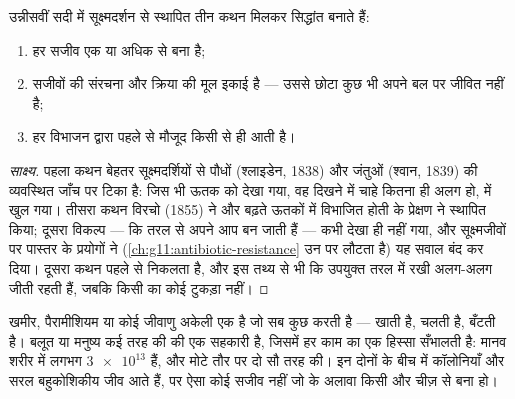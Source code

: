 \begin{proposition}[कोशिका सिद्धांत]\label{prop:g10:cells-common-unit:theory}
उन्नीसवीं सदी में सूक्ष्मदर्शन से स्थापित तीन कथन मिलकर  सिद्धांत
बनाते हैं:
\begin{enumerate}
  \item हर सजीव एक या अधिक  से बना है;
  \item {} सजीवों की संरचना और क्रिया की मूल इकाई है --- उससे छोटा
        कुछ भी अपने बल पर जीवित नहीं है;
  \item हर  विभाजन द्वारा पहले से मौजूद किसी  से ही आती है।
\end{enumerate}
\end{proposition}
\begin{proof}[साक्ष्य]
पहला कथन बेहतर सूक्ष्मदर्शियों से पौधों (श्लाइडेन, 1838) और जंतुओं
(श्वान, 1839) की व्यवस्थित जाँच पर टिका है: जिस भी ऊतक को देखा गया, वह
दिखने में चाहे कितना ही अलग हो,  में खुल गया। तीसरा कथन विरचो
(1855) ने और बढ़ते ऊतकों में विभाजित होती  के प्रेक्षण ने
स्थापित किया; दूसरा विकल्प --- कि  तरल से अपने आप बन जाती हैं ---
कभी देखा ही नहीं गया, और सूक्ष्मजीवों पर पास्तर के प्रयोगों ने
(\cref{ch:g11:antibiotic-resistance} उन पर लौटता है) यह सवाल बंद कर दिया।
दूसरा कथन पहले से निकलता है, और इस तथ्य से भी कि उपयुक्त तरल में रखी
अलग-अलग  जीती रहती हैं, जबकि किसी  का कोई टुकड़ा नहीं।
\end{proof}

\begin{example}[एक कोशिका या अनेक]\label{ex:g10:cells-common-unit:onemany}
खमीर, पैरामीशियम या कोई जीवाणु अकेली एक  है जो सब कुछ करती है ---
खाती है, चलती है, बँटती है। बलूत या मनुष्य कई तरह की  की एक
सहकारी है, जिसमें हर  काम का एक हिस्सा सँभालती है: मानव शरीर में
लगभग $\num{3e13}$  हैं, और मोटे तौर पर दो सौ तरह की। इन दोनों के
बीच में कॉलोनियाँ और सरल बहुकोशिकीय जीव आते हैं, पर ऐसा कोई सजीव नहीं जो
 के अलावा किसी और चीज़ से बना हो।
\end{example}

